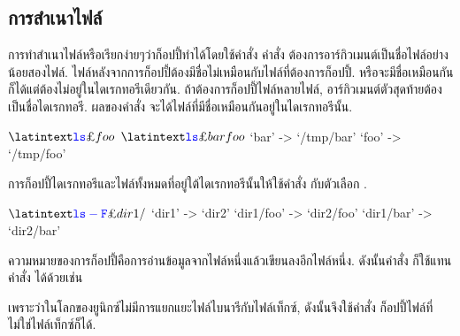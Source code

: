 \begin{thwbr}
\subsection{การสำเนาไฟล์}
การทำสำเนาไฟล์หรือเรียกง่ายๆว่าก็อปปี้ทำได้โดยใช้คำสั่ง 
คำสั่ง  ต้องการอาร์กิวเมนต์เป็นชื่อไฟล์อย่างน้อยสองไฟล์. ไฟล์หลังจากการก็อปปี้ต้องมีชื่อไม่เหมือนกับไฟล์ที่ต้องการก็อปปี้. หรือจะมีชื่อเหมือนกันก็ได้แต่ต้องไม่อยู่ในไดเรกทอรีเดียวกัน. ถ้าต้องการก็อปปี้ไฟล์หลายไฟล์, อาร์กิวเมนต์ตัวสุดท้ายต้องเป็นชื่อไดเรกทอรี. ผลของคำสั่ง  จะได้ไฟล์ที่มีชื่อเหมือนกันอยู่ในไดเรกทอรีนั้น.
\begin{MyExample}
\begin{MyEx}
$ \cin{ls}
foo
$ 
$ \cin{ls}
bar foo
$ 
`bar' -> `/tmp/bar'
`foo' -> `/tmp/foo'
\end{MyEx}
\end{MyExample}

การก็อปปี้ไดเรกทอรีและไฟล์ทั้งหมดที่อยู่ใต้ไดเรกทอรีนั้นให้ใช้คำสั่ง  กับตัวเลือก .
\begin{MyExample}
\begin{MyEx}
$ \cin{ls -F}
dir1/
$ 
`dir1' -> `dir2'
`dir1/foo' -> `dir2/foo'
`dir1/bar' -> `dir2/bar'
\end{MyEx}
\end{MyExample}

ความหมายของการก็อปปี้คือการอ่านข้อมูลจากไฟล์หนึ่งแล้วเขียนลงอีกไฟล์หนึ่ง. ดังนั้นคำสั่ง  ก็ใช้แทนคำสั่ง  ได้ด้วยเช่น
\begin{MyExample}
\end{MyExample}%
เพราะว่าในโลกของยูนิกซ์ไม่มีการแยกแยะไฟล์ไบนารีกับไฟล์เท็กซ์, ดังนั้นจึงใช้คำสั่ง  ก็อปปี้ไฟล์ที่ไม่ใช่ไฟล์เท็กซ์ก็ได้.


\end{thwbr}
